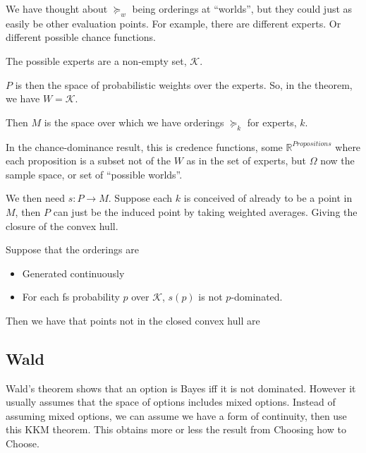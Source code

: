 \documentclass[11pt]{article}
\theoremstyle{definition}
\theoremstyle{remark}
\newcommand{\R}{\mathbb R}
\begin{document}
We have thought about $\succeq_w$ being orderings at ``worlds'', but they could just as easily be other evaluation points. For example, there are different experts. Or different possible chance functions. 

The possible experts are a non-empty set, $\mathcal{K}$. 

$P$ is then the space of probabilistic weights over the experts. So, in the theorem, we have $W=\mathcal{K}$.

Then $M$ is the space over which we have orderings $\succeq_k$ for experts, $k$.

In the chance-dominance result, this is credence functions, some $\R^{Propositions}$ where each proposition is a subset not of the $W$ as in the set of experts, but $\Omega$ now the sample space, or set of ``possible worlds''. 

We then need $s:P\to M$. 
Suppose each $k$ is conceived of already to be a point in $M$, then $P$ can just be the induced point by taking weighted averages. Giving the closure of the convex hull. 

Suppose that the orderings are
\begin{itemize}
	\item Generated continuously
	\item For each fs probability $p$ over $\mathcal{K}$, $s(p)$ is not $p$-dominated. 
\end{itemize}
Then we have that points not in the closed convex hull are 

\subsection{Wald}

Wald's theorem shows that an option is Bayes iff it is not dominated. However it usually assumes that the space of options includes mixed options. Instead of assuming mixed options, we can assume we have a form of continuity, then use this KKM theorem. This obtains more or less the result from Choosing how to Choose. 
\end{document}
